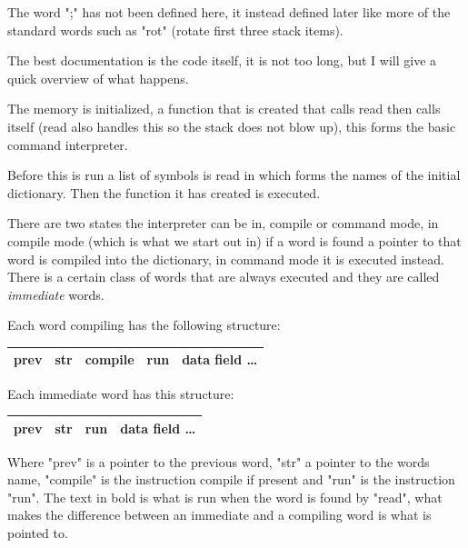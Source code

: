 \documentclass	[a4paper, 10pt]	{article}
\begin{document}
      The word ";" has not been defined here, it instead defined later like
      more of the standard words such as "rot" (rotate first three stack
      items). 

      The best documentation is the code itself, it is not too long, but
      I will give a quick overview of what happens.

      The memory is initialized, a function that is created that calls
      read then calls itself (read also handles this so the stack does
      not blow up), this forms the basic command interpreter.

      Before this is run a list of symbols is read in which forms the
      names of the initial dictionary. Then the function it has created
      is executed.

      There are two states the interpreter can be in, compile or command
      mode, in compile mode (which is what we start out in) if a word is
      found a pointer to that word is compiled into the dictionary, in
      command mode it is executed instead. There is a certain class of
      words that are always executed and they are called \emph{immediate}
      words.

      Each word compiling has the following structure:

      \begin{center}
        \begin{tabular}{l | c | c | c | r }
          \hline
          prev & str & \textbf{compile} & run & data field \ldots \\
          \hline
        \end{tabular}
      \end{center}

      Each immediate word has this structure:
      
      \begin{center}
        \begin{tabular}{l | c | c | r }
          \hline
          prev & str & \textbf{run} & data field \ldots \\
          \hline
        \end{tabular}
      \end{center}

      Where "prev" is a pointer to the previous word, "str" a pointer to the words
      name, "compile" is the instruction compile if present and "run" is the instruction
      "run". The text in bold is what is run when the word is found by "read", what makes
      the difference between an immediate and a compiling word is what is pointed to.
\end{document}
